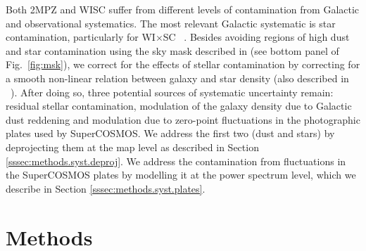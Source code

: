 \documentclass[useAMS,usenatbib]{mn2e}
\newcommand{\wisc}{WI$\times$SC}
\def\citejap#1{\citeauthor{#1}\ \citeyear{#1}}
\begin{document}
    Both 2MPZ and WISC suffer from different levels of contamination from Galactic and observational systematics. The most relevant Galactic systematic is star contamination, particularly for \wisc~ \citep{2019JCAP...08..037X}. Besides avoiding regions of high dust and star contamination using the sky mask described in \cite{2018MNRAS.481.1133P} (see bottom panel of Fig.\!~\ref{fig:msk}), we correct for the effects of stellar contamination by correcting for a smooth non-linear relation between galaxy and star density (also described in \citejap{2018MNRAS.481.1133P}). After doing so, three potential sources of systematic uncertainty remain: residual stellar contamination, modulation of the galaxy density due to Galactic dust reddening and modulation due to zero-point fluctuations in the photographic plates used by SuperCOSMOS. We address the first two (dust and stars) by deprojecting them at the map level as described in Section \ref{sssec:methods.syst.deproj}. We address the contamination from fluctuations in the SuperCOSMOS plates by modelling it at the power spectrum level, which we describe in Section \ref{sssec:methods.syst.plates}.

\section{Methods}\label{sec:methods}
\end{document}
